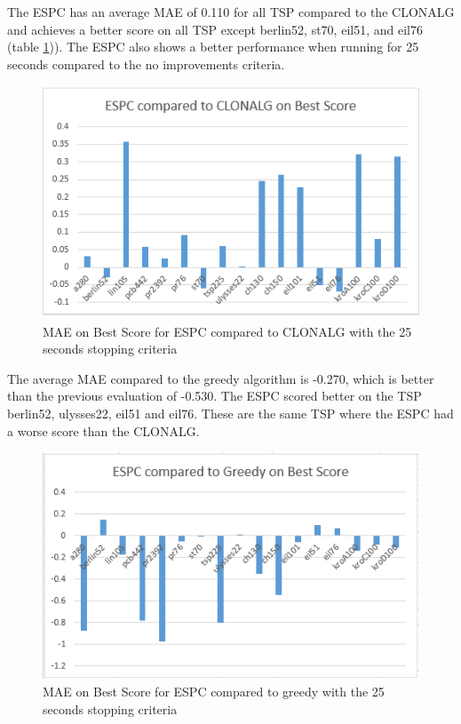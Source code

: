 The ESPC has an average MAE of 0.110 for all TSP compared to the CLONALG and achieves a better score on all TSP except berlin52, st70, eil51, and eil76 (table \ref{ESPC_Time})). The ESPC also shows a better performance when running for 25 seconds compared to the no improvements criteria.
\begin{figure}[H]
	\includegraphics[]{Images/ESPC_Time.png}
	\caption{MAE on Best Score for ESPC compared to CLONALG with the 25 seconds stopping criteria}
	\label{ESPC_Time}
\end{figure}
The average MAE compared to the greedy algorithm is -0.270, which is better than the previous evaluation of -0.530. The ESPC scored better on the TSP berlin52, ulysses22, eil51 and eil76. These are the same TSP where the ESPC had a worse score than the CLONALG.
\begin{figure}[H]
	\includegraphics[]{Images/ESPC_greedy_Time.png}
	\caption{MAE on Best Score for ESPC compared to greedy with the 25 seconds stopping criteria}
	\label{ESPC_greedy_TIME}
\end{figure}
\newpage
